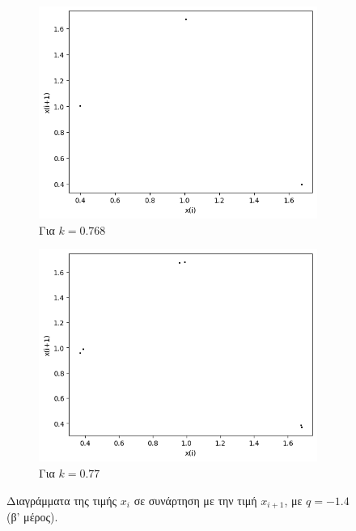 \begin{figure}[ht]
\begin{subfigure}[b]{0.4\textwidth}
		\includegraphics[width=\textwidth]{LateX images/graphs q14/g23}
		\caption{Για $k=0.768$}
		\label{f:k83}
	\end{subfigure}
	\hfill
	\begin{subfigure}[b]{0.4\textwidth}
		\centering
		\includegraphics[width=\textwidth]{LateX images/graphs q14/g24}
		\caption{Για $k=0.77$}
		\label{f:k80}
	\end{subfigure}
	\hfill
	\caption{Διαγράμματα της τιμής \(x_i\) σε συνάρτηση με την τιμή \(x_{i+1}\), με $q=-1.4$ (β' μέρος).}
\end{figure}

